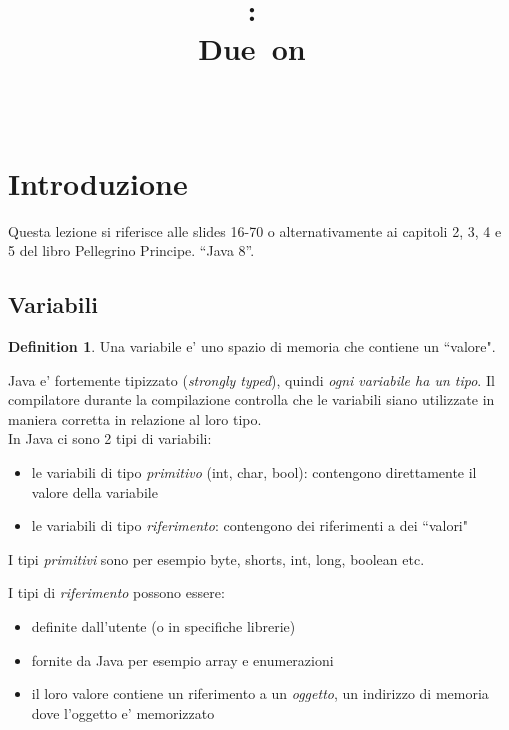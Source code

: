 \documentclass{article}
\title{
\vspace{2in}
\textmd{\textbf{\hmwkClass:\ \hmwkTitle}}\\
\normalsize\vspace{0.1in}\small{Due\ on\ \hmwkDueDate}\\
\vspace{0.1in}\large{\textit{\hmwkClassInstructor\ \hmwkClassTime}}
\vspace{3in}
}
\author{\textbf{\hmwkAuthorName}}
\date{} %
\begin{document}
\maketitle



\newpage
\tableofcontents
\newpage

\theoremstyle{definition} 

\newtheorem{mydef}{Definition}
\newtheorem{lemma}{Lemma}

\newtheorem{theorem}{Theorem}[section]


\section{Introduzione}
Questa lezione si riferisce alle slides 16-70  o alternativamente ai capitoli 2, 3, 4 e 5 del libro  Pellegrino Principe. “Java 8”.

\subsection{Variabili}
\begin{mydef} Una variabile e' uno spazio di memoria che contiene un ``valore". 
\end{mydef}
Java e' fortemente tipizzato (\emph{strongly typed}), quindi \emph{ogni variabile ha un tipo}. Il compilatore durante la compilazione controlla che le variabili siano utilizzate in maniera corretta in relazione al loro tipo.\\

In Java ci sono 2 tipi di variabili:
\begin{itemize}
\item le variabili di tipo \emph{primitivo} (int, char, bool): contengono direttamente il valore della variabile
\item le variabili di tipo \emph{riferimento}: contengono dei riferimenti a dei ``valori"
\end{itemize}

I tipi \emph{primitivi} sono per esempio byte, shorts, int, long, boolean etc.


I tipi di \emph{riferimento} possono essere:
\begin{itemize}
\item definite dall'utente (o in specifiche librerie)
\item fornite da Java per esempio array e enumerazioni
\item il loro valore contiene un riferimento a un \emph{oggetto}, un indirizzo di memoria dove l'oggetto e' memorizzato
\end{itemize}
\end{document}
